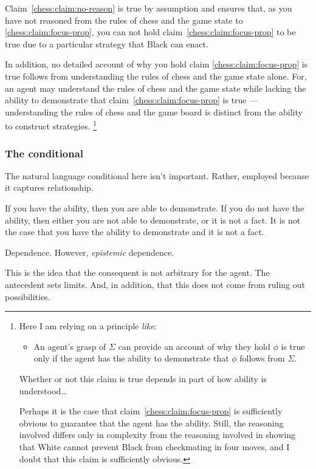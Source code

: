 \documentclass[10pt]{article}
\begin{document}
Claim~\ref{chess:claim:no-reason} is true by assumption and ensures that, as you have not reasoned from the rules of chess and the game state to \ref{chess:claim:focus-prop}, you can not hold claim~\ref{chess:claim:focus-prop} to be true due to a particular strategy that Black can enact.

In addition, no detailed account of why you hold claim \ref{chess:claim:focus-prop} is true follows from understanding the rules of chess and the game state alone.
For, an agent may understand the rules of chess and the game state while lacking the ability to demonstrate that claim~\ref{chess:claim:focus-prop} is true --- understanding the rules of chess and the game board is distinct from the ability to construct strategies.\nolinebreak
\footnote{
  Here I am relying on a principle \emph{like}:
  \begin{itemize}
  \item An agent's grasp of \(\Sigma\) can provide an account of why they hold \(\phi\) is true only if the agent has the ability to demonstrate that \(\phi\) follows from \(\Sigma\).
  \end{itemize}
  {
    \color{red}
    Whether or not this claim is true depends in part of how ability is understood\dots
  }

  Perhaps it is the case that claim~\ref{chess:claim:focus-prop} is sufficiently obvious to guarantee that the agent has the ability.
  Still, the reasoning involved differs only in complexity from the reasoning involved in showing that White cannot prevent Black from checkmating in four moves, and I doubt that this claim is sufficiently obvious.
}

\subsubsection{The conditional}
\label{sec:conditional}

The natural language conditional here isn't important.
Rather, employed because it captures relationship.

If you have the ability, then you are able to demonstrate.
If you do not have the ability, then either you are not able to demonstrate, or it is not a fact.
It is not the case that you have the ability to demonstrate and it is not a fact.

{
  \color{red}
  Dependence.
}
However, \emph{epistemic} dependence.

This is the idea that the consequent is not arbitrary for the agent.
The antecedent sets limits.
And, in addition, that this does not come from ruling out possibilities.
\end{document}
